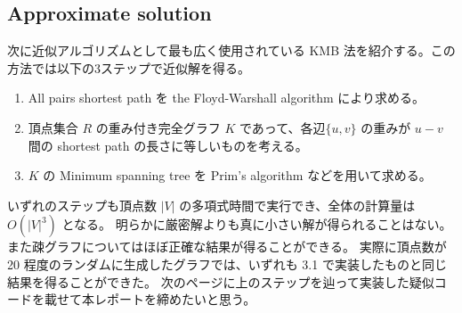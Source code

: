 \documentclass[12pt,uplatex,dvipdfmx,titlepage]{article}
\theoremstyle{case}
\begin{document}
    \subsection{Approximate solution}
    次に近似アルゴリズムとして最も広く使用されている KMB 法\cite{KMB}を紹介する。この方法では以下の3ステップで近似解を得る。
    \begin{enumerate}
        \item All pairs shortest path を the Floyd-Warshall algorithm により求める。
        \item 頂点集合 $R$ の重み付き完全グラフ $K$ であって、各辺$\{u,v\}$ の重みが $u-v$ 間の shortest path の長さに等しいものを考える。
        \item $K$ の Minimum spanning tree を Prim's algorithm などを用いて求める。
    \end{enumerate}
    いずれのステップも頂点数 $|V|$ の多項式時間で実行でき、全体の計算量は $O(|V|^3)$ となる。
    明らかに厳密解よりも真に小さい解が得られることはない。
    また疎グラフについてはほぼ正確な結果が得ることができる。
    実際に頂点数が 20 程度のランダムに生成したグラフでは、いずれも 3.1 で実装したものと同じ結果を得ることができた。
    次のページに上のステップを辿って実装した疑似コードを載せて本レポートを締めたいと思う。
\end{document}
